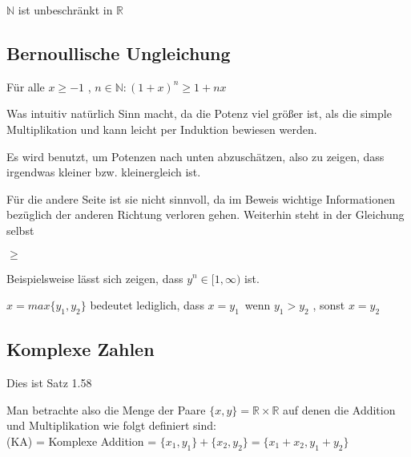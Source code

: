\documentclass[smallheadings,headsepline,12pt,a4paper]{scrartcl}
\begin{document}
\begin{center}
\item[Lemma 1.52]
\end{center}
\item $ \mathbb{N} $ ist unbeschränkt in $\mathbb{R}$ 

\newpage

\subsection*{Bernoullische Ungleichung}

\item Für alle $ x \geq -1 $ , $ n\in \mathbb{N} : (1+x)^n \geq  1+nx $ 
\item Was intuitiv natürlich Sinn macht, da die Potenz viel größer ist, als die simple Multiplikation und kann leicht per Induktion bewiesen werden.
\item Es wird benutzt, um Potenzen nach unten abzuschätzen, also zu zeigen, dass irgendwas kleiner bzw. kleinergleich ist.
\item Für die andere Seite ist sie nicht sinnvoll, da im Beweis wichtige Informationen bezüglich der anderen Richtung verloren gehen. Weiterhin steht in der Gleichung selbst \begin{center}
$\geq $
\end{center} 
\item Beispielsweise lässt sich zeigen, dass $ y^{n} \in [1,\infty) $ ist.

\begin{center}
\item[Max und Min Funktion]
\end{center}
\item $x = max\{y_1,y_2\} $ bedeutet lediglich, dass $ x=y_1 \, $ wenn $ y_1 > y_2 $ , sonst $ x = y_2 $

\newpage

\subsection*{Komplexe Zahlen}

\item Dies ist Satz 1.58\\

\item Man betrachte also die Menge der Paare $\{x,y\}= \mathbb{R} \times \mathbb{R} $ auf denen die Addition und Multiplikation wie folgt definiert sind: \\
(KA) = Komplexe Addition = $\{x_1,y_1\} + \{x_2,y_2\} = \{x_1+x_2,y_1+y_2\} $ \\
\end{document}
